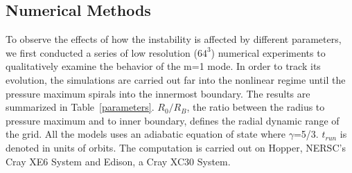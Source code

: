 \documentclass[iop,revtex4]{emulateapj}
\begin{document}
\subsection{Numerical Methods}
To observe the effects of how the instability is affected by different parameters, we first conducted a series of low resolution ($64^3$) numerical experiments to qualitatively examine the behavior of the m=1 mode. In order to track its evolution, the simulations are carried out far into the nonlinear regime until the pressure maximum spirals into the innermost boundary. The results are summarized in Table~\ref{parameters}. $R_0/R_B$, the ratio between the radius to pressure maximum and to inner boundary, defines the radial dynamic range of the grid.  All the models uses an adiabatic equation of state where $\gamma$=5/3. $t_{run}$ is denoted in units of orbits. The computation is carried out on Hopper, NERSC's Cray XE6 System and Edison, a Cray XC30 System.
\end{document}
